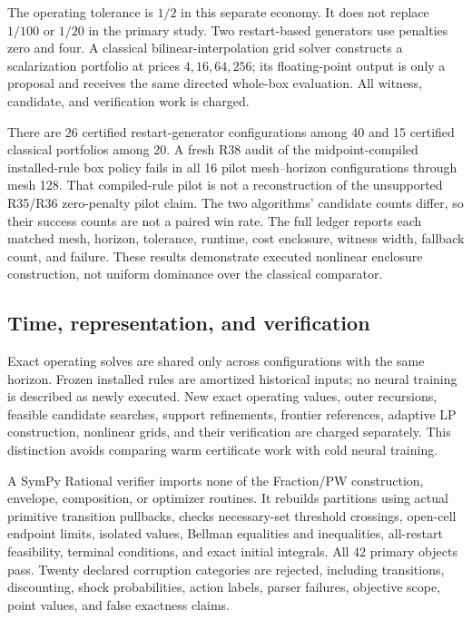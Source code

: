 The operating tolerance is $1/2$ in this separate economy. It does not replace $1/100$ or $1/20$ in the primary study. Two restart-based generators use penalties zero and four. A classical bilinear-interpolation grid solver constructs a scalarization portfolio at prices $4,16,64,256$; its floating-point output is only a proposal and receives the same directed whole-box evaluation. All witness, candidate, and verification work is charged.

There are 26 certified restart-generator configurations among 40 and 15 certified classical portfolios among 20. A fresh R38 audit of the midpoint-compiled installed-rule box policy fails in all 16 pilot mesh--horizon configurations through mesh 128. That compiled-rule pilot is not a reconstruction of the unsupported R35/R36 zero-penalty pilot claim. The two algorithms' candidate counts differ, so their success counts are not a paired win rate. The full ledger reports each matched mesh, horizon, tolerance, runtime, cost enclosure, witness width, fallback count, and failure. These results demonstrate executed nonlinear enclosure construction, not uniform dominance over the classical comparator.

\subsection{Time, representation, and verification}

Exact operating solves are shared only across configurations with the same horizon. Frozen installed rules are amortized historical inputs; no neural training is described as newly executed. New exact operating values, outer recursions, feasible candidate searches, support refinements, frontier references, adaptive LP construction, nonlinear grids, and their verification are charged separately. This distinction avoids comparing warm certificate work with cold neural training.

A SymPy Rational verifier imports none of the Fraction/PW construction, envelope, composition, or optimizer routines. It rebuilds partitions using actual primitive transition pullbacks, checks necessary-set threshold crossings, open-cell endpoint limits, isolated values, Bellman equalities and inequalities, all-restart feasibility, terminal conditions, and exact initial integrals. All 42 primary objects pass. Twenty declared corruption categories are rejected, including transitions, discounting, shock probabilities, action labels, parser failures, objective scope, point values, and false exactness claims.


